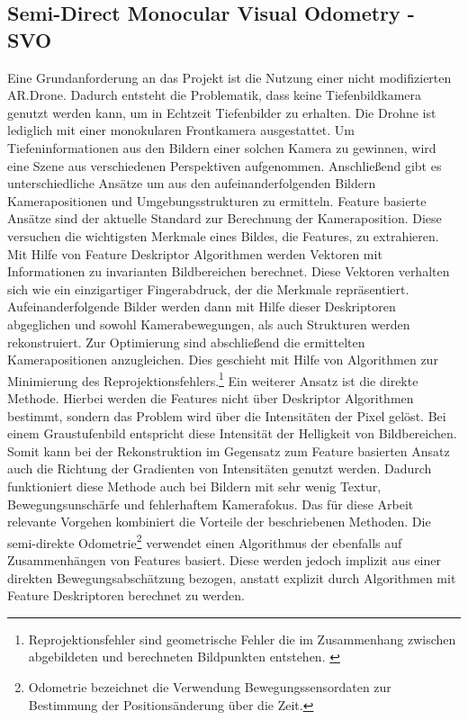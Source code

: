 \subsection{Semi-Direct Monocular Visual Odometry - SVO}
Eine Grundanforderung an das Projekt ist die Nutzung einer nicht modifizierten AR.Drone. Dadurch entsteht die Problematik, dass keine Tiefenbildkamera genutzt werden kann, um in Echtzeit Tiefenbilder zu erhalten. Die Drohne ist lediglich mit einer monokularen Frontkamera ausgestattet. \newline
Um Tiefeninformationen aus den Bildern einer solchen Kamera zu gewinnen, wird eine Szene aus verschiedenen Perspektiven aufgenommen. Anschließend gibt es unterschiedliche Ansätze um aus den aufeinanderfolgenden Bildern Kamerapositionen und Umgebungsstrukturen zu ermitteln. \newline
Feature basierte Ansätze sind der aktuelle Standard zur Berechnung der Kameraposition. Diese versuchen die wichtigsten Merkmale eines Bildes, die Features, zu extrahieren. Mit Hilfe von Feature Deskriptor Algorithmen werden Vektoren mit Informationen zu invarianten Bildbereichen berechnet. Diese Vektoren verhalten sich wie ein einzigartiger Fingerabdruck, der die Merkmale repräsentiert. \newline
Aufeinanderfolgende Bilder werden dann mit Hilfe dieser Deskriptoren abgeglichen und sowohl Kamerabewegungen, als auch Strukturen werden rekonstruiert. Zur Optimierung sind abschließend die ermittelten Kamerapositionen anzugleichen. Dies geschieht mit Hilfe von Algorithmen zur Minimierung des Reprojektionsfehlers.\footnote{Reprojektionsfehler sind geometrische Fehler die im Zusammenhang zwischen abgebildeten und berechneten Bildpunkten entstehen. \cite{repro}} 
\newline
Ein weiterer Ansatz ist die direkte Methode. Hierbei werden die Features nicht über Deskriptor Algorithmen bestimmt, sondern das Problem wird über die Intensitäten der Pixel gelöst. Bei einem Graustufenbild entspricht diese Intensität der Helligkeit von Bildbereichen. \newline
Somit kann bei der Rekonstruktion im Gegensatz zum Feature basierten Ansatz auch die Richtung der Gradienten von Intensitäten genutzt werden. Dadurch funktioniert diese Methode auch bei Bildern mit sehr wenig Textur, Bewegungsunschärfe und fehlerhaftem Kamerafokus. \newline
Das für diese Arbeit relevante Vorgehen kombiniert die Vorteile der beschriebenen Methoden. Die semi-direkte Odometrie\footnote{Odometrie bezeichnet die Verwendung Bewegungssensordaten zur Bestimmung der Positionsänderung über die Zeit.\cite{hodor}} verwendet einen Algorithmus der ebenfalls auf Zusammenhängen von Features basiert. Diese werden jedoch implizit aus einer direkten Bewegungsabschätzung bezogen, anstatt explizit durch Algorithmen mit Feature Deskriptoren berechnet zu werden. \newline
